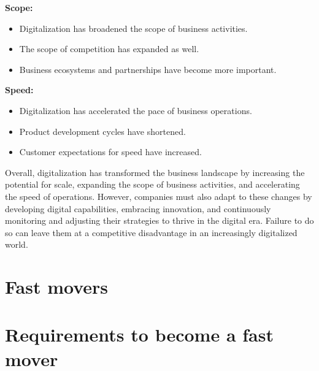 \documentclass[a4]{scrartcl}
\begin{document}
	
	\textbf{Scope:}
	\begin{itemize}
		\item Digitalization has broadened the scope of business activities.
		\item The scope of competition has expanded as well.
		\item Business ecosystems and partnerships have become more important.
	\end{itemize}
	
	
	\textbf{Speed:}
	\begin{itemize}
		\item Digitalization has accelerated the pace of business operations.
		\item Product development cycles have shortened.
		\item Customer expectations for speed have increased.
	\end{itemize}
	
	Overall, digitalization has transformed the business landscape by increasing the potential for scale, expanding the scope of business activities, and accelerating the speed of operations. However, companies must also adapt to these changes by developing digital capabilities, embracing innovation, and continuously monitoring and adjusting their strategies to thrive in the digital era. Failure to do so can leave them at a competitive disadvantage in an increasingly digitalized world.
	
	
	
	
	
	
	
	
	
	\section{Fast movers}
	
	
	
	
	
	
	
	
	
	
	
	
	
	\section{Requirements to become a fast mover}
	
	
	
	\cite{digitalmatrix}
	\cite{leadingdigital}
	\cite{wiwi}
	
	
	
	
	
	\printbibliography
	
	
	
	
	
	
\end{document}
